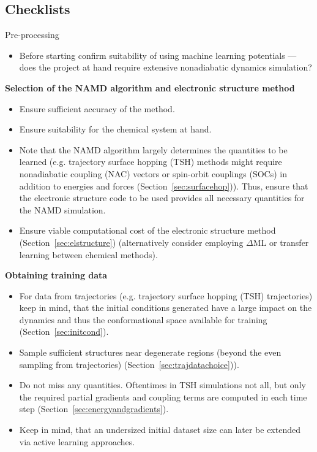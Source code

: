 \documentclass[9pt,bestpractices]{livecoms}
\begin{document}
\begin{Checklists*}[p!]
\section{Checklists}

\begin{checklist}{Pre-processing}
\begin{itemize}
\item Before starting confirm suitability of using machine learning potentials --- does the project at hand require extensive nonadiabatic dynamics simulation?
\end{itemize}

\textbf{Selection of the NAMD algorithm and electronic structure method}
\begin{itemize}
\item Ensure sufficient accuracy of the method.
\item Ensure suitability for the chemical system at hand.
\item Note that the NAMD algorithm largely determines the quantities to be learned (e.g. trajectory surface hopping (TSH) methods might require nonadiabatic coupling (NAC) vectors or spin-orbit couplings (SOCs) in addition to energies and forces (Section~\ref{sec:surfacehop})).
Thus, ensure that the electronic structure code to be used provides all necessary quantities for the NAMD simulation.
\item Ensure viable computational cost of the electronic structure method (Section~\ref{sec:elstructure}) (alternatively consider employing $\Delta$ML or transfer learning between chemical methods).
\end{itemize}

\textbf{Obtaining training data}
\begin{itemize}
\item For data from trajectories (e.g. trajectory surface hopping (TSH) trajectories) keep in mind, that the initial conditions generated have a large impact on the dynamics and thus the conformational space available for training (Section~\ref{sec:initcond}).
\item Sample sufficient structures near degenerate regions (beyond the even sampling from trajectories) (Section~\ref{sec:trajdatachoice})).
\item Do not miss any quantities. Oftentimes in TSH simulations not all, but only the required partial gradients and coupling terms are computed in each time step (Section~\ref{sec:energyandgradients}).
\item Keep in mind, that an undersized initial dataset size can later be extended via active learning approaches.
\end{itemize}
\end{checklist}




\end{Checklists*}
\end{document}
